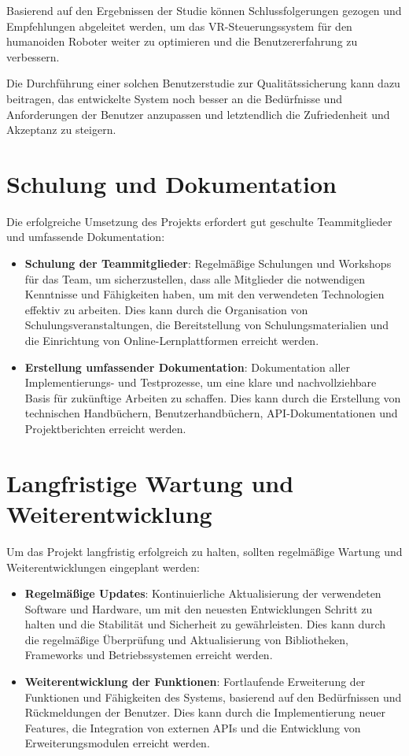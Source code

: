 Basierend auf den Ergebnissen der Studie können Schlussfolgerungen gezogen und Empfehlungen abgeleitet werden, um das VR-Steuerungssystem für den humanoiden Roboter weiter zu optimieren und die Benutzererfahrung zu verbessern.

Die Durchführung einer solchen Benutzerstudie zur Qualitätssicherung kann dazu beitragen, das entwickelte System noch besser an die Bedürfnisse und Anforderungen der Benutzer anzupassen und letztendlich die Zufriedenheit und Akzeptanz zu steigern.

\section{Schulung und Dokumentation}
Die erfolgreiche Umsetzung des Projekts erfordert gut geschulte Teammitglieder und umfassende Dokumentation:
\begin{itemize}
    \item \textbf{Schulung der Teammitglieder}: Regelmäßige Schulungen und Workshops für das Team, um sicherzustellen, dass alle Mitglieder die notwendigen Kenntnisse und Fähigkeiten haben, um mit den verwendeten Technologien effektiv zu arbeiten. Dies kann durch die Organisation von Schulungsveranstaltungen, die Bereitstellung von Schulungsmaterialien und die Einrichtung von Online-Lernplattformen erreicht werden.
    \item \textbf{Erstellung umfassender Dokumentation}: Dokumentation aller Implementierungs- und Testprozesse, um eine klare und nachvollziehbare Basis für zukünftige Arbeiten zu schaffen. Dies kann durch die Erstellung von technischen Handbüchern, Benutzerhandbüchern, API-Dokumentationen und Projektberichten erreicht werden.
\end{itemize}

\section{Langfristige Wartung und Weiterentwicklung}
Um das Projekt langfristig erfolgreich zu halten, sollten regelmäßige Wartung und Weiterentwicklungen eingeplant werden:
\begin{itemize}
    \item \textbf{Regelmäßige Updates}: Kontinuierliche Aktualisierung der verwendeten Software und Hardware, um mit den neuesten Entwicklungen Schritt zu halten und die Stabilität und Sicherheit zu gewährleisten. Dies kann durch die regelmäßige Überprüfung und Aktualisierung von Bibliotheken, Frameworks und Betriebssystemen erreicht werden.
    \item \textbf{Weiterentwicklung der Funktionen}: Fortlaufende Erweiterung der Funktionen und Fähigkeiten des Systems, basierend auf den Bedürfnissen und Rückmeldungen der Benutzer. Dies kann durch die Implementierung neuer Features, die Integration von externen APIs und die Entwicklung von Erweiterungsmodulen erreicht werden.
\end{itemize}

